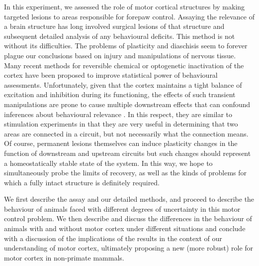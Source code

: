In this experiment, we assessed the role of motor cortical structures by making targeted lesions to areas responsible for forepaw control. Assaying the relevance of a brain structure has long involved surgical lesions of that structure and subsequent detailed analysis of any behavioural deficits. This method is not without its difficulties. The problems of plasticity and diaschisis seem to forever plague our conclusions based on injury and manipulations of nervous tissue. Many recent methods for reversible chemical or optogenetic inactivation of the cortex have been proposed to improve statistical power of behavioural assessments. Unfortunately, given that the cortex maintains a tight balance of excitation and inhibition during its functioning, the effects of such transient manipulations are prone to cause multiple downstream effects that can confound inferences about behavioural relevance \cite{Otchy2015}. In this respect, they are similar to stimulation experiments in that they are very useful in determining that two areas are connected in a circuit, but not necessarily what the connection means. Of course, permanent lesions themselves can induce plasticity changes in the function of downstream and upstream circuits but such changes should represent a homeostatically stable state of the system. In this way, we hope to simultaneously probe the limits of recovery, as well as the kinds of problems for which a fully intact structure is definitely required.

We first describe the assay and our detailed methods, and proceed to describe the behaviour of animals faced with different degrees of uncertainty in this motor control problem. We then describe and discuss the differences in the behaviour of animals with and without motor cortex under different situations and conclude with a discussion of the implications of the results in the context of our understanding of motor cortex, ultimately proposing a new (more robust) role for motor cortex in non-primate mammals.
